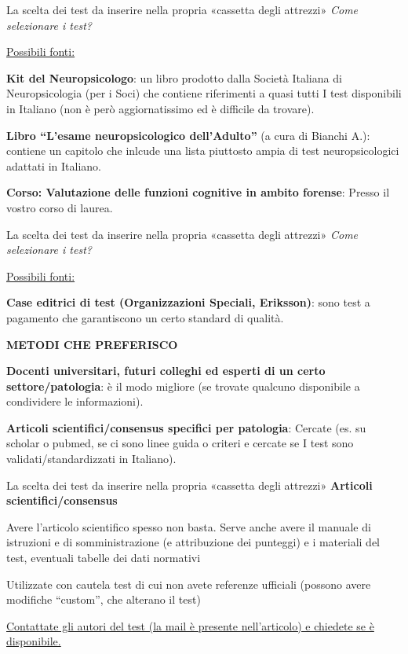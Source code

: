 \documentclass[
  ignorenonframetext,
]{beamer}
\begin{document}
\begin{frame}{La scelta dei test da inserire nella propria «cassetta
degli attrezzi»}
\label{la-scelta-dei-test-da-inserire-nella-propria-cassetta-degli-attrezzi-1}
\emph{Come selezionare i test?}

\underline{Possibili fonti:}

\textbf{Kit del Neuropsicologo}: un libro prodotto dalla Società
Italiana di Neuropsicologia (per i Soci) che contiene riferimenti a
quasi tutti I test disponibili in Italiano (non è però aggiornatissimo
ed è difficile da trovare).

\textbf{Libro ``L'esame neuropsicologico dell'Adulto''} (a cura di
Bianchi A.): contiene un capitolo che inlcude una lista piuttosto ampia
di test neuropsicologici adattati in Italiano.

\textbf{Corso: Valutazione delle funzioni cognitive in ambito forense}:
Presso il vostro corso di laurea.
\end{frame}

\begin{frame}{La scelta dei test da inserire nella propria «cassetta
degli attrezzi»}
\label{la-scelta-dei-test-da-inserire-nella-propria-cassetta-degli-attrezzi-2}
\emph{Come selezionare i test?}

\underline{Possibili fonti:}

\textbf{Case editrici di test (Organizzazioni Speciali, Eriksson)}: sono
test a pagamento che garantiscono un certo standard di qualità.

\begin{center}
  \textbf{METODI CHE PREFERISCO}
\end{center}

\textbf{Docenti universitari, futuri colleghi ed esperti di un certo
settore/patologia}: è il modo migliore (se trovate qualcuno disponibile
a condividere le informazioni).

\textbf{Articoli scientifici/consensus specifici per patologia}: Cercate
(es. su scholar o pubmed, se ci sono linee guida o criteri e cercate se
I test sono validati/standardizzati in Italiano).
\end{frame}

\begin{frame}{La scelta dei test da inserire nella propria «cassetta
degli attrezzi»}
\label{la-scelta-dei-test-da-inserire-nella-propria-cassetta-degli-attrezzi-3}
\textbf{Articoli scientifici/consensus}

Avere l'articolo scientifico spesso non basta. Serve anche avere il
manuale di istruzioni e di somministrazione (e attribuzione dei
punteggi) e i materiali del test, eventuali tabelle dei dati normativi

Utilizzate con cautela test di cui non avete referenze ufficiali
(possono avere modifiche ``custom'', che alterano il test)

\underline{Contattate gli autori del test (la mail è presente nell’articolo) e chiedete se è disponibile.}
\end{frame}
\end{document}
